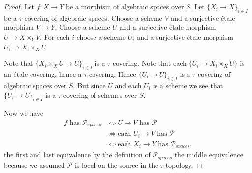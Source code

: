 \documentclass[10pt,a4paper]{amsart}
\theoremstyle{plain}
\theoremstyle{definition}
\theoremstyle{remark}
\numberwithin{equation}{subsection}
\begin{document}
\begin{proof}
Let $f : X \to Y$ be a morphism of algebraic spaces over $S$.
Let $\{X_i \to X\}_{i \in I}$ be a $\tau$-covering of algebraic spaces.
Choose a scheme $V$ and a surjective \'etale morphism $V \to Y$.
Choose a scheme $U$ and a surjective \'etale morphism $U \to X \times_Y V$.
For each $i$ choose a scheme $U_i$ and a surjective \'etale morphism
$U_i \to X_i \times_X U$.

\medskip\noindent
Note that $\{X_i \times_X U \to U\}_{i \in I}$ is a $\tau$-covering.
Note that each $\{U_i \to X_i \times_X U\}$ is an \'etale covering,
hence a $\tau$-covering. Hence $\{U_i \to U\}_{i \in I}$ is a
$\tau$-covering of algebraic spaces over $S$. But since $U$ and each $U_i$
is a scheme we see that $\{U_i \to U\}_{i \in I}$ is a
$\tau$-covering of schemes over $S$.

\medskip\noindent
Now we have
\begin{align*}
f \text{ has }\mathcal{P}_{spaces}
& \Leftrightarrow
U \to V \text{ has }\mathcal{P} \\
& \Leftrightarrow
\text{each }U_i \to V \text{ has }\mathcal{P} \\
& \Leftrightarrow
\text{each }X_i \to Y\text{ has }\mathcal{P}_{spaces}.
\end{align*}
the first and last equivalence by the definition of
$\mathcal{P}_{spaces}$ the middle equivalence because we assumed
$\mathcal{P}$ is local on the source in the $\tau$-topology.
\end{proof}
\end{document}
